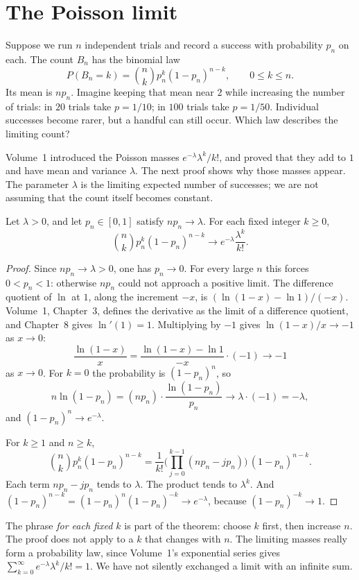 \section{The Poisson limit}

Suppose we run $n$ independent trials and record a success with probability $p_n$ on each. The count $B_n$ has the binomial law
\[
 P(B_n=k)=\binom nk p_n^k(1-p_n)^{n-k},\qquad 0\le k\le n.
\]
Its mean is $np_n$. Imagine keeping that mean near $2$ while increasing the number of trials: in $20$ trials take $p=1/10$; in $100$ trials take $p=1/50$. Individual successes become rarer, but a handful can still occur. Which law describes the limiting count?

Volume~1 introduced the Poisson masses $e^{-\lambda}\lambda^k/k!$, and proved that they add to $1$ and have mean and variance $\lambda$. The next proof shows why those masses appear. The parameter $\lambda$ is the limiting expected number of successes; we are not assuming that the count itself becomes constant.

\begin{theorem}\label{thm:poissonlimit}
Let $\lambda>0$, and let $p_n\in[0,1]$ satisfy $np_n\to\lambda$. For each fixed integer $k\ge0$,
\[
 \binom{n}{k}p_n^k(1-p_n)^{n-k}\to e^{-\lambda}\frac{\lambda^k}{k!}.
\]
\end{theorem}
\begin{proof}
Since $np_n\to\lambda>0$, one has $p_n\to0$. For every large $n$ this forces $0<p_n<1$: otherwise $np_n$ could not approach a positive limit. The difference quotient of $\ln$ at $1$, along the increment $-x$, is $(\ln(1-x)-\ln 1)/(-x)$. Volume~1, Chapter~3, defines the derivative as the limit of a difference quotient, and Chapter~8 gives $\ln'(1)=1$. Multiplying by $-1$ gives $\ln(1-x)/x\to-1$ as $x\to0$:
\[
 \frac{\ln(1-x)}{x}
 =\frac{\ln(1-x)-\ln 1}{-x}\cdot(-1)\to-1
\]
as $x\to0$. For $k=0$ the probability is $(1-p_n)^n$, so
\[
 n\ln(1-p_n)=(np_n)\cdot\frac{\ln(1-p_n)}{p_n}\to\lambda\cdot(-1)=-\lambda,
\]
and $(1-p_n)^n\to e^{-\lambda}$.

For $k\ge1$ and $n\ge k$,
\[
 \binom{n}{k}p_n^k(1-p_n)^{n-k}
 =\frac1{k!}\Biggl(\prod_{j=0}^{k-1}(np_n-jp_n)\Biggr)\,(1-p_n)^{n-k}.
\]
Each term $np_n-jp_n$ tends to $\lambda$. The product tends to $\lambda^k$. And $(1-p_n)^{n-k}=(1-p_n)^n(1-p_n)^{-k}\to e^{-\lambda}$, because $(1-p_n)^{-k}\to1$.
\end{proof}

The phrase \emph{for each fixed $k$} is part of the theorem: choose $k$ first, then increase $n$. The proof does not apply to a $k$ that changes with $n$. The limiting masses really form a probability law, since Volume~1's exponential series gives $\sum_{k=0}^{\infty}e^{-\lambda}\lambda^k/k!=1$. We have not silently exchanged a limit with an infinite sum.

